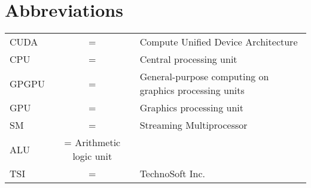 
\section*{{\Huge Abbreviations}}
\vspace{1 cm}

\noindent
\begin{center}
\begin{tabular}{ l c l }
   CUDA & = & Compute Unified Device Architecture \\
   CPU & = & Central processing unit \\
   GPGPU & = & General-purpose computing on graphics processing units \\
   GPU & = & Graphics processing unit \\
   SM & = & Streaming Multiprocessor \\
   ALU & = Arithmetic logic unit \\
   TSI & = & TechnoSoft Inc. \\
\end{tabular}
\end{center}

\cleardoublepage

\pagestyle{fancy}
\fancyhf{}
\renewcommand{\chaptermark}[1]{\markboth{\chaptername\ \thechapter.\ #1}{}}
\renewcommand{\sectionmark}[1]{\markright{\thesection\ #1}}
\renewcommand{\headrulewidth}{0.1ex}
\renewcommand{\footrulewidth}{0.1ex}
\fancyfoot[LE,RO]{\thepage}
\fancyhead[LE]{\leftmark}
\fancyhead[RO]{\rightmark}
\fancypagestyle{plain}{\fancyhf{}\fancyfoot[LE,RO]{\thepage}\renewcommand{\headrulewidth}{0ex}}

\setcounter{page}{1}
